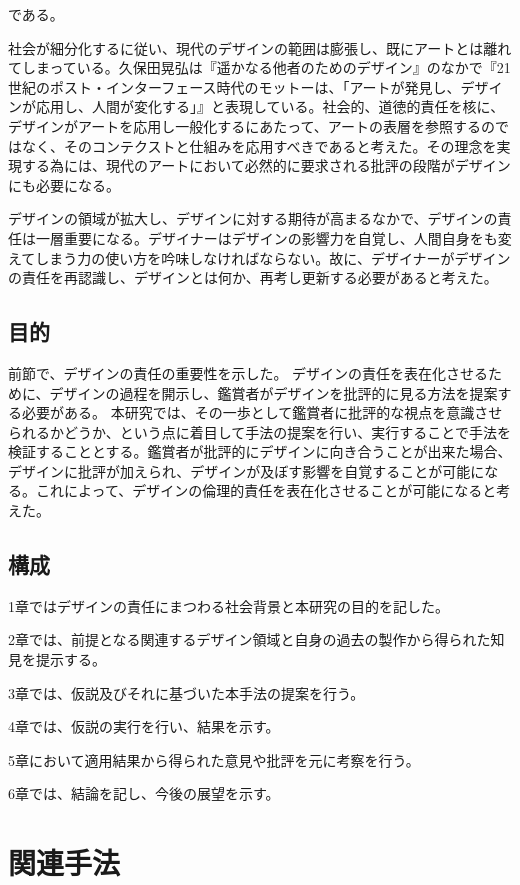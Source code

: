\documentclass{jsarticle}
\begin{document}
である。




社会が細分化するに従い、現代のデザインの範囲は膨張し、既にアートとは離れてしまっている。久保田晃弘は『遥かなる他者のためのデザイン』\cite{kubota}のなかで『21世紀のポスト・インターフェース時代のモットーは、「アートが発見し、デザインが応用し、人間が変化する」』と表現している。社会的、道徳的責任を核に、デザインがアートを応用し一般化するにあたって、アートの表層を参照するのではなく、そのコンテクストと仕組みを応用すべきであると考えた。その理念を実現する為には、現代のアートにおいて必然的に要求される批評の段階がデザインにも必要になる。


デザインの領域が拡大し、デザインに対する期待が高まるなかで、デザインの責任は一層重要になる。デザイナーはデザインの影響力を自覚し、人間自身をも変えてしまう力の使い方を吟味しなければならない。故に、デザイナーがデザインの責任を再認識し、デザインとは何か、再考し更新する必要があると考えた。


\newpage
\subsection{目的}
前節で、デザインの責任の重要性を示した。
デザインの責任を表在化させるために、デザインの過程を開示し、鑑賞者がデザインを批評的に見る方法を提案する必要がある。
本研究では、その一歩として鑑賞者に批評的な視点を意識させられるかどうか、という点に着目して手法の提案を行い、実行することで手法を検証することとする。鑑賞者が批評的にデザインに向き合うことが出来た場合、デザインに批評が加えられ、デザインが及ぼす影響を自覚することが可能になる。これによって、デザインの倫理的責任を表在化させることが可能になると考えた。

\newpage
\subsection{構成}
1章ではデザインの責任にまつわる社会背景と本研究の目的を記した。

2章では、前提となる関連するデザイン領域と自身の過去の製作から得られた知見を提示する。

3章では、仮説及びそれに基づいた本手法の提案を行う。

4章では、仮説の実行を行い、結果を示す。

5章において適用結果から得られた意見や批評を元に考察を行う。

6章では、結論を記し、今後の展望を示す。

\newpage
\section{関連手法}
\end{document}
